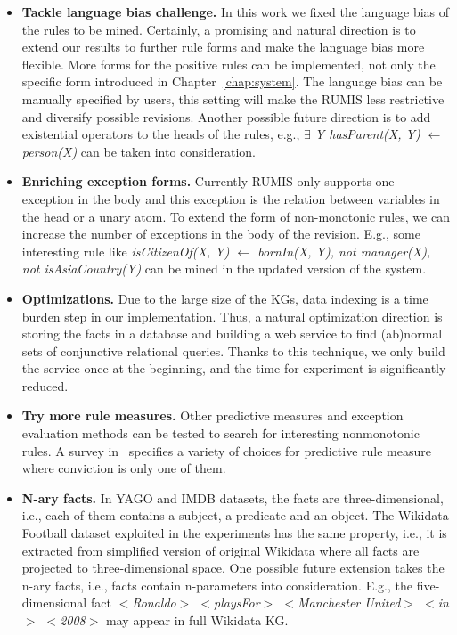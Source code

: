 \begin{itemize}
\item \textbf{Tackle language bias challenge.} In this work we fixed the language bias of the rules to be mined. Certainly, a promising and natural direction is to extend our results to further rule forms and make the language bias more flexible. More forms for the positive rules can be implemented, not only the specific form introduced in Chapter~\ref{chap:system}. The language bias can be manually specified by users, this setting will make the RUMIS less restrictive and diversify possible revisions. Another possible future direction is to add existential operators to the heads of the rules, e.g., \textit{$\exists$ Y hasParent(X, Y) $\leftarrow$ person(X)} can be taken into consideration.
\item \textbf{Enriching exception forms.} Currently RUMIS only supports one exception in the body and this exception is the relation between variables in the head or a unary atom. To extend the form of non-monotonic rules, we can increase the number of exceptions in the body of the revision. E.g., some interesting rule like \textit{isCitizenOf(X, Y) $\leftarrow$ bornIn(X, Y), not manager(X), not isAsiaCountry(Y)} can be mined in the updated version of the system.
\item \textbf{Optimizations.} Due to the large size of the KGs, data indexing is a time burden step in our implementation. Thus, a natural optimization direction is storing the facts in a database and building a web service to find (ab)normal sets of conjunctive relational queries. Thanks to this technique, we only build the service once at the beginning, and the time for experiment is significantly reduced.
\item \textbf{Try more rule measures.} Other predictive measures and exception evaluation methods can be tested to search for interesting nonmonotonic rules. A survey in~\cite{ref46} specifies a variety of choices for predictive rule measure where conviction is only one of them.
\item \textbf{N-ary facts.} In YAGO and IMDB datasets, the facts are three-dimensional, i.e., each of them contains a subject, a predicate and an object. The Wikidata Football dataset exploited in the experiments has the same property, i.e., it is extracted from simplified version of original Wikidata where all facts are projected to three-dimensional space. One possible future extension takes the n-ary facts, i.e., facts contain n-parameters into consideration. E.g., the five-dimensional fact \textit{$<$Ronaldo$>$ $<$playsFor$>$ $<$Manchester United$>$ $<$in$>$ $<$2008$>$} may appear in full Wikidata KG.

\end{itemize}
